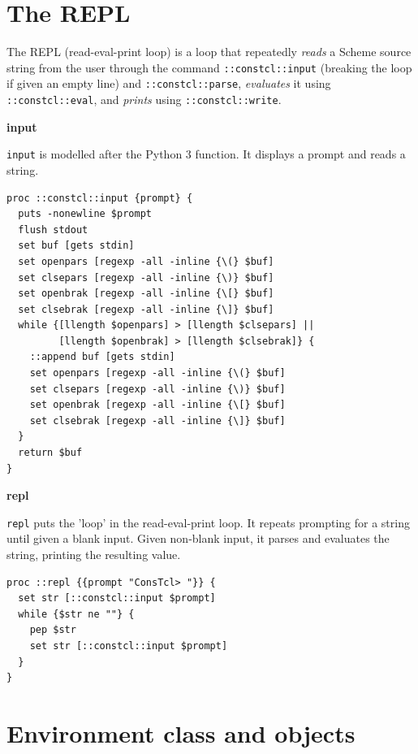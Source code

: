 \documentclass[twoside,9pt]{report}
\begin{document}
\chapter{The REPL}
\label{the-repl}

The REPL (read-eval-print loop) is a loop that repeatedly \emph{reads} a Scheme source string from the user through the command \texttt{::constcl::input} (breaking the loop if given an empty line) and \texttt{::constcl::parse}, \emph{evaluates} it using \texttt{::constcl::eval}, and \emph{prints} using \texttt{::constcl::write}.


\textbf{input}


\texttt{input} is modelled after the Python 3 function. It displays a prompt and reads a string.

\noindent\makebox[\linewidth]{\rule{\linewidth}{0.4pt}}
\begin{lstlisting}
proc ::constcl::input {prompt} {
  puts -nonewline $prompt
  flush stdout
  set buf [gets stdin]
  set openpars [regexp -all -inline {\(} $buf]
  set clsepars [regexp -all -inline {\)} $buf]
  set openbrak [regexp -all -inline {\[} $buf]
  set clsebrak [regexp -all -inline {\]} $buf]
  while {[llength $openpars] > [llength $clsepars] ||
         [llength $openbrak] > [llength $clsebrak]} {
    ::append buf [gets stdin]
    set openpars [regexp -all -inline {\(} $buf]
    set clsepars [regexp -all -inline {\)} $buf]
    set openbrak [regexp -all -inline {\[} $buf]
    set clsebrak [regexp -all -inline {\]} $buf]
  }
  return $buf
}
\end{lstlisting}
\noindent\makebox[\linewidth]{\rule{\linewidth}{0.4pt}}

\textbf{repl}


\texttt{repl} puts the 'loop' in the read-eval-print loop. It repeats prompting for a string until given a blank input. Given non-blank input, it parses and evaluates the string, printing the resulting value.

\noindent\makebox[\linewidth]{\rule{\linewidth}{0.4pt}}
\begin{lstlisting}
proc ::repl {{prompt "ConsTcl> "}} {
  set str [::constcl::input $prompt]
  while {$str ne ""} {
    pep $str
    set str [::constcl::input $prompt]
  }
}
\end{lstlisting}
\noindent\makebox[\linewidth]{\rule{\linewidth}{0.4pt}}
\chapter{Environment class and objects}
\label{environment-class-and-objects}
\end{document}
